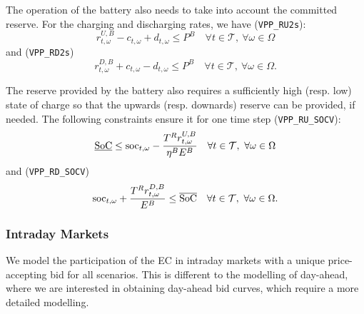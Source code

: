 The operation of the battery also needs to take into account the committed reserve. For the charging and discharging rates, we have (\verb|VPP_RU2s|):
\begin{equation} \label{EQ:VPP_RU2s}
	r^{U, B} _{t, \omega} - c_{t, \omega} + d_{t, \omega}  \leq P^B \quad \forall t \in \mathcal{T}, \ \forall \omega \in \Omega
\end{equation}
and (\verb|VPP_RD2s|)
\begin{equation} \label{EQ:VPP_RD2s}
	r^{D, B}_{t, \omega} + c_{t, \omega} - d_{t, \omega} \leq P^B \quad \forall t \in \mathcal{T}, \ \forall \omega \in \Omega.
\end{equation}

The reserve provided by the battery also requires a sufficiently high (resp. low) state of charge so that the upwards (resp. downards) reserve can be provided, if needed. The following constraints ensure it for one time step (\verb|VPP_RU_SOCV|):
\begin{equation} \label{EQ:VPP_RU_SOCV}
	\underline{\text{SoC}} \leq \text{soc}_{t, \omega} - \frac{T^R r^{U, B}_{t, \omega}}{\eta^B E^B} \quad \forall t \in \mathcal{T}, \ \forall \omega \in \Omega
\end{equation}
and  (\verb|VPP_RD_SOCV|)
\begin{equation} \label{EQ:VPP_RD_SOCV}
	\text{soc}_{t, \omega} + \frac{T^R r^{D, B}_{t, \omega} }{E^B} \leq \overline{\text{SoC}} \quad \forall t \in \mathcal{T}, \ \forall \omega \in \Omega.
\end{equation}

\subsubsection{Intraday Markets}

We model the participation of the EC in intraday markets with a unique price-accepting bid for all scenarios. This is different to the modelling of day-ahead, where we are interested in obtaining day-ahead bid curves, which require a more detailed modelling.


